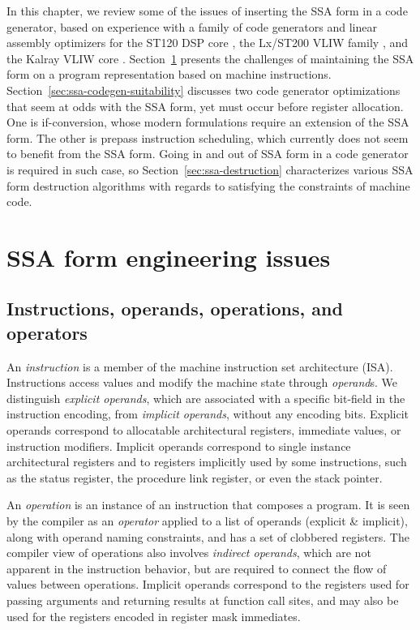 In this chapter, we review some of the issues of inserting the SSA form in a code
generator, based on experience with a family of code generators and linear
assembly optimizers for the ST120 DSP core \cite{Dinechin:2000:ME}
\cite{Dinechin:2000:CASES,Stoutchinin:2001:MICRO,Rastello:2004:CGO}, the
Lx/ST200 VLIW family \cite{Faraboschi:2000:ISCA}
\cite{Dinechin:2007:MISTA,Dinechin:2008:EuroPar,Boissinot:2008:CGO,Boissinot:2009:CGO,Boissinot:2011:APLAS},
and the Kalray VLIW core \cite{Dinechin:2013:HPEC}.
Section~\ref{sec:ssa-codegen-engineering} presents the challenges of maintaining
the SSA form on a program representation based on machine instructions.
Section~\ref{sec:ssa-codegen-suitability} discusses two code generator
optimizations that seem at odds with the SSA form, yet must occur before register
allocation. One is if-conversion, whose modern formulations require an extension
of the SSA form. The other is prepass instruction scheduling, which currently
does not seem to benefit from the SSA form.  Going in and out of SSA form in a
code generator is required in such case, so Section~\ref{sec:ssa-destruction}
characterizes various SSA form destruction algorithms with regards to satisfying
the constraints of machine code.


\section{SSA form engineering issues}
\label{sec:ssa-codegen-engineering}

\subsection{Instructions, operands, operations, and operators}

An \emph{instruction} is a member of the machine instruction set architecture
(ISA). Instructions access values and modify the machine state through
\emph{operand}s. We distinguish \emph{explicit operands}, which are associated
with a specific bit-field in the instruction encoding, from \emph{implicit
operands}, without any encoding bits.  Explicit operands correspond to
allocatable architectural registers, immediate values, or instruction modifiers.
Implicit operands correspond to single instance architectural registers and to
registers implicitly used by some instructions, such as the status register, the
procedure link register, or even the stack pointer.

An \emph{operation} is an instance of an instruction that composes a program. It
is seen by the compiler as an \emph{operator} applied to a list of operands
(explicit \& implicit), along with operand naming constraints, and has a set of
clobbered registers. The compiler view of operations also involves
\emph{indirect operands}, which are not apparent in the instruction behavior,
but are required to connect the flow of values between operations.  Implicit
operands correspond to the registers used for passing arguments and returning
results at function call sites, and may also be used for the registers
encoded in register mask immediates.

